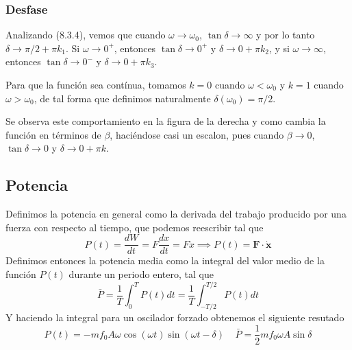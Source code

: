 \subsubsection{Desfase}
Analizando (8.3.4), vemos que cuando $\omega \rightarrow \omega_0$, $\tan \delta \rightarrow \infty$ y por lo tanto $\delta \rightarrow \pi/2 +\pi k_1$. Si $\omega \rightarrow 0^+$, entonces $\tan \delta \rightarrow 0^+$ y $\delta \rightarrow 0 +\pi k_2$, y si $\omega \rightarrow \infty$, entonces $\tan \delta \rightarrow 0^-$ y $\delta \rightarrow 0 +\pi k_3$.

Para que la función sea contínua, tomamos $k=0$ cuando $\omega < \omega_0$ y $k=1$ cuando $\omega > \omega_0$, de tal forma que definimos naturalmente $\delta(\omega_0) = \pi/2$.

Se observa este comportamiento en la figura de la derecha y como \newline cambia la función en términos de $\beta$, haciéndose casi un escalon, \newline pues cuando $\beta \rightarrow 0$, $\tan \delta \rightarrow 0$ y $\delta \rightarrow 0+\pi k$.
\subsection{Potencia}
Definimos la potencia en general como la derivada del trabajo \newline producido por una fuerza con respecto al tiempo, que podemos \newline reescribir tal que
\begin{equation} \label{6.1.1}
    P(t) = \frac{dW}{dt} = F \frac{dx}{dt} = F \dot{x} \implies P(t) = \mathbf{F} \cdot \dot{\mathbf{x}}
\end{equation}
Definimos entonces la potencia media como la integral del valor medio de la función $P(t)$ durante un periodo entero, tal que 
\begin{equation} \label{6.1.1}
    \bar{P} = \frac{1}{T} \int_0^T P(t)dt = \frac{1}{T} \int_{-T/2}^{T/2} P(t)dt
\end{equation}
Y haciendo la integral para un oscilador forzado obtenemos el siguiente resutado
\begin{equation} \label{6.1.1}
    P(t)= -m f_0 A \omega \cos(\omega t) \sin(\omega t -\delta) \ \ \ \ \ \bar{P} = \frac{1}{2} m f_0 \omega A \sin\delta 
\end{equation}
\vspace{-30pt}
